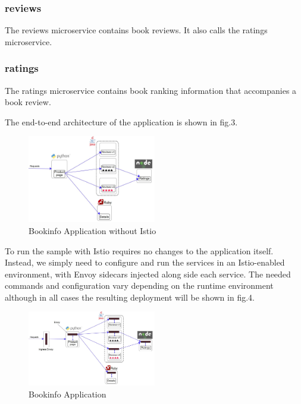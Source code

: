 \documentclass[conference]{IEEEtran}
\begin{document}
\subsubsection{reviews}
The reviews microservice contains book reviews. It also calls the ratings microservice.

\subsubsection{ratings}
The ratings microservice contains book ranking information that accompanies a book review.\cite{bookinfo}

The end-to-end architecture of the application is shown in fig.3.
\begin{figure}[htbp]
	\centering
	\includegraphics[width=0.5\textwidth]{figure/3.jpg}
	\caption{Bookinfo Application without Istio\cite{bookinfo}\label{fig:3}}
\end{figure}\par

To run the sample with Istio requires no changes to the application itself. Instead, we simply need to configure and run the services in an Istio-enabled environment, with Envoy sidecars injected along side each service. The needed commands and configuration vary depending on the runtime environment although in all cases the resulting deployment will be shown in fig.4.

\begin{figure}[htbp]
	\centering
	\includegraphics[width=0.5\textwidth]{figure/4.jpg}
	\caption{Bookinfo Application\cite{bookinfo}\label{fig:4}}
\end{figure}
\end{document}
